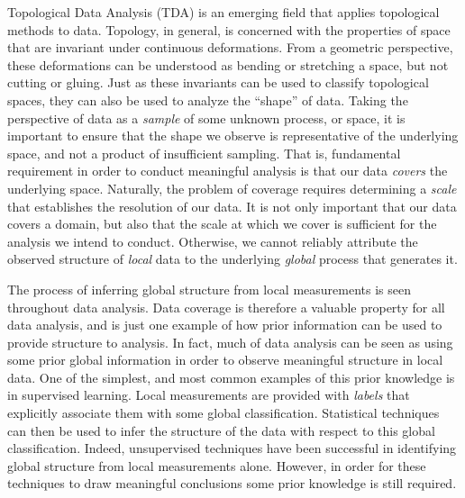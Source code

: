 
Topological Data Analysis (TDA) is an emerging field that applies topological methods to data.
Topology, in general, is concerned with the properties of space that are invariant under continuous deformations.
From a geometric perspective, these deformations can be understood as bending or stretching a space, but not cutting or gluing.
Just as these invariants can be used to classify topological spaces, they can also be used to analyze the ``shape'' of data.
Taking the perspective of data as a \emph{sample} of some unknown process, or space, it is important to ensure that the shape we observe is representative of the underlying space, and not a product of insufficient sampling.
That is, fundamental requirement in order to conduct meaningful analysis is that our data \emph{covers} the underlying space.
Naturally, the problem of coverage requires determining a \emph{scale} that establishes the resolution of our data.
It is not only important that our data covers a domain, but also that the scale at which we cover is sufficient for the analysis we intend to conduct.
Otherwise, we cannot reliably attribute the observed structure of \emph{local} data to the underlying \emph{global} process that generates it.

The process of inferring global structure from local measurements is seen throughout data analysis.
Data coverage is therefore a valuable property for all data analysis, and is just one example of how prior information can be used to provide structure to analysis.
In fact, much of data analysis can be seen as using some prior global information in order to observe meaningful structure in local data.
One of the simplest, and most common examples of this prior knowledge is in supervised learning.
Local measurements are provided with \emph{labels} that explicitly associate them with some global classification.
Statistical techniques can then be used to infer the structure of the data with respect to this global classification.
Indeed, unsupervised techniques have been successful in identifying global structure from local measurements alone.
However, in order for these techniques to draw meaningful conclusions some prior knowledge is still required.

